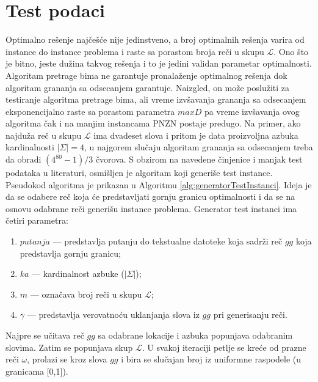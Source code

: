 \documentclass[12pt,oneside]{memoir}
\begin{document}
\section{Test podaci}
\label{sec:testPodaci}
Optimalno rešenje najčešće nije jedinstveno,
a broj optimalnih rešenja varira od instance do instance problema i raste sa porastom
broja reči u skupu $\mathcal{L}$. Ono što je bitno, jeste dužina takvog rešenja i to je
jedini validan parametar optimalnosti. Algoritam pretrage bima ne garantuje pronalaženje
optimalnog rešenja dok algoritam grananja sa odsecanjem garantuje. Naizgled, on može poslužiti
za testiranje algoritma pretrage bima, ali
vreme izvšavanja grananja sa odsecanjem eksponencijalno raste sa porastom parametra $maxD$
pa vreme izvšavanja ovog algoritma čak i na manjim instancama PNZN postaje predugo.
Na primer, ako najduža reč u skupu $\mathcal{L}$ ima dvadeset slova i pritom je
data proizvoljna azbuka kardinalnosti $|\Sigma|=4$, u najgorem slučaju
algoritam grananja sa odsecanjem treba da obradi $(4^{80}-1)/3$ čvorova.
S obzirom na navedene činjenice i manjak test podataka u literaturi, osmišljen je
algoritam koji generiše test instance. Pseudokod algoritma je prikazan u
Algoritmu \ref{alg:generatorTestInstanci}. Ideja je da se odabere reč koja će 
predstavljati gornju granicu optimalnosti i da se na osnovu odabrane reči
generišu instance problema.
Generator test instanci ima četiri parametra:
\begin{enumerate}
  \item $putanja$ — predstavlja putanju do
  tekstualne datoteke koja sadrži reč $gg$ koja predstavlja gornju granicu;
  \item $ka$ — kardinalnost azbuke ($|\Sigma|$);
  \item $m$ — označava broj reči u skupu $\mathcal{L}$;
  \item $\gamma$ — predstavlja verovatnoću uklanjanja slova iz $gg$ pri generisanju
  reči.
\end{enumerate}
Najpre se učitava reč $gg$ sa odabrane lokacije i azbuka popunjava
odabranim slovima. Zatim se popunjava skup $\mathcal{L}$.
U svakoj iteraciji petlje se kreće od prazne reči $\omega$, prolazi se
kroz slova $gg$ i bira se slučajan broj iz uniformne raspodele (u granicama [0,1]).
\end{document}
